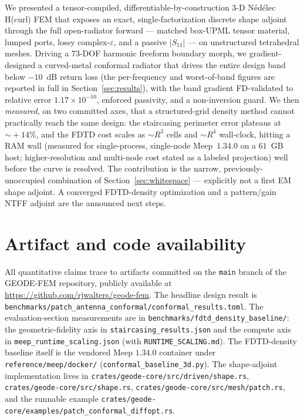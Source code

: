 \documentclass{anvil-paper}
\begin{document}
We presented a tensor-compiled, differentiable-by-construction 3-D N\'ed\'elec
H(curl) FEM that exposes an exact, single-factorization discrete shape adjoint
through the full open-radiator forward --- matched box-UPML tensor material,
lumped ports, lossy complex-$\varepsilon$, and a passive $|S_{11}|$ --- on
unstructured tetrahedral meshes. Driving a 73-DOF harmonic freeform boundary
morph, we gradient-designed a curved-metal conformal radiator that drives the
entire design band below $-10$~dB return loss (the per-frequency and
worst-of-band figures are reported in full in Section~\ref{sec:results}), with
the band gradient FD-validated to relative error
$1.17\times10^{-10}$, enforced passivity, and a non-inversion guard. We then
\emph{measured}, on two committed axes, that a structured-grid density method
cannot practically reach the same design: the staircasing perimeter error
plateaus at $\sim\!+14\%$, and the FDTD cost scales as $\sim\!R^3$ cells and
$\sim\!R^4$ wall-clock, hitting a RAM wall (measured for single-process,
single-node Meep~$1.34.0$ on a $61$~GB host; higher-resolution and multi-node
cost stated as a labeled projection) well before the curve is resolved.
The contribution is the narrow, previously-unoccupied combination of
Section~\ref{sec:whitespace} --- explicitly not a first EM shape adjoint. A
converged FDTD-density optimization and a pattern/gain NTFF adjoint are the
announced next steps.

\section*{Artifact and code availability}
\label{sec:availability}
All quantitative claims trace to artifacts committed on the \texttt{main} branch
of the GEODE-FEM repository, publicly available at
\url{https://github.com/rjwalters/geode-fem}. The headline design result is
\texttt{benchmarks/patch\_antenna\_conformal/conformal\_results.toml}. The
evaluation-section measurements are in \texttt{benchmarks/fdtd\_density\_baseline/}:
the geometric-fidelity axis in \texttt{staircasing\_results.json} and the compute
axis in \texttt{meep\_runtime\_scaling.json} (with \texttt{RUNTIME\_SCALING.md}).
The FDTD-density baseline itself is the vendored Meep $1.34.0$ container under
\texttt{reference/meep/docker/} (\texttt{conformal\_baseline\_3d.py}). The
shape-adjoint implementation lives in
\texttt{crates/geode-core/src/driven/shape.rs},
\texttt{crates/geode-core/src/shape.rs},
\texttt{crates/geode-core/src/mesh/patch.rs}, and the runnable example
\texttt{crates/geode-core/examples/patch\_conformal\_diffopt.rs}.



\end{document}
